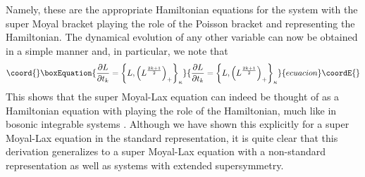 \documentclass[a4paper,11pt]{article}
\begin{document}
Namely, these are the appropriate Hamiltonian equations for the system
with the super Moyal bracket playing the role of the Poisson bracket
and \coordHE{} representing the
Hamiltonian. The dynamical evolution of any other variable can now be
obtained in a simple manner and, in particular, we note that
\begin{equation}\coord{}\boxEquation{
{\partial L\over \partial t_{k}} = \left\{L, \left(L^{2k+1\over
2}\right)_{+}\right\}_{\kappa}
}{
{\partial L\over \partial t_{k}} = \left\{L, \left(L^{2k+1\over
2}\right)_{+}\right\}_{\kappa}
}{ecuacion}\coordE{}\end{equation}
This shows that the super Moyal-Lax equation can indeed be thought of
as a Hamiltonian equation with \coordHE{} playing
the role of the Hamiltonian, much like in bosonic integrable systems
\cite{13}.  Although we have shown this explicitly
for a super Moyal-Lax equation in the standard representation, it is
quite clear that this derivation generalizes to a super Moyal-Lax
equation  with a non-standard representation as well as systems
with extended supersymmetry.
\end{document}

